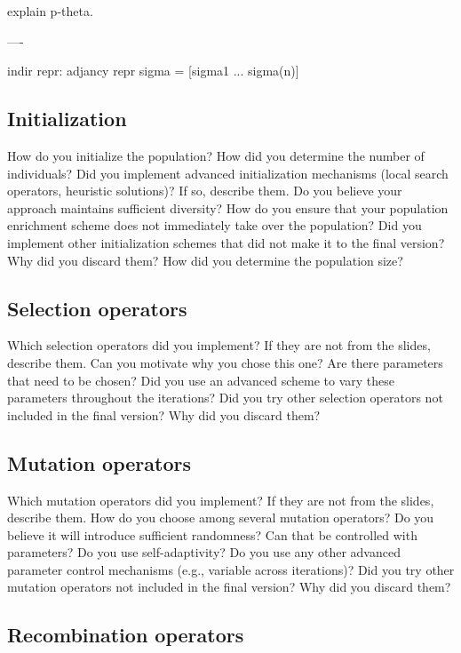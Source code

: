 \documentclass[a4paper,10pt]{article}
\newcommand{\ReplaceMe}[1]{{\color{blue}#1}}
\begin{document}
	explain p-theta.
	
	
	----
	
	indir repr: adjancy repr sigma = [sigma1 ... sigma(n)]

\subsection{Initialization}

\ReplaceMe{How do you initialize the population? How did you determine the number of individuals? Did you implement advanced initialization mechanisms (local search operators, heuristic solutions)? If so, describe them. Do you believe your approach maintains sufficient diversity? How do you ensure that your population enrichment scheme does not immediately take over the population? Did you implement other initialization schemes that did not make it to the final version? Why did you discard them? How did you determine the population size?}

\subsection{Selection operators}

\ReplaceMe{Which selection operators did you implement? If they are not from the slides, describe them. Can you motivate why you chose this one? Are there parameters that need to be chosen? Did you use an advanced scheme to vary these parameters throughout the iterations? Did you try other selection operators not included in the final version? Why did you discard them?}

\subsection{Mutation operators}

\ReplaceMe{Which mutation operators did you implement? If they are not from the slides, describe them. How do you choose among several mutation operators? Do you believe it will introduce sufficient randomness? Can that be controlled with parameters? Do you use self-adaptivity? Do you use any other advanced parameter control mechanisms (e.g., variable across iterations)? Did you try other mutation operators not included in the final version? Why did you discard them?}

\subsection{Recombination operators}
\end{document}

